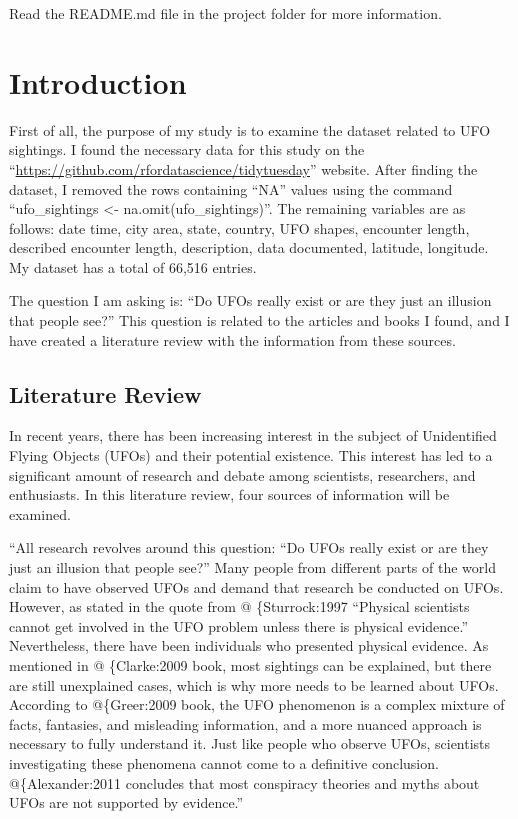 \documentclass[
]{article}
\begin{document}
\colorbox{WildStrawberry}{Read the README.md file in the project folder for more information.}

\hypertarget{introduction}{%
\section{Introduction}\label{introduction}}

First of all, the purpose of my study is to examine the dataset related to UFO sightings. I found the necessary data for this study on the ``\url{https://github.com/rfordatascience/tidytuesday}'' website. After finding the dataset, I removed the rows containing ``NA'' values using the command ``ufo\_sightings \textless- na.omit(ufo\_sightings)''. The remaining variables are as follows: date time, city area, state, country, UFO shapes, encounter length, described encounter length, description, data documented, latitude, longitude. My dataset has a total of 66,516 entries.

The question I am asking is: ``Do UFOs really exist or are they just an illusion that people see?'' This question is related to the articles and books I found, and I have created a literature review with the information from these sources.

\hypertarget{literature-review}{%
\subsection{Literature Review}\label{literature-review}}

In recent years, there has been increasing interest in the subject of Unidentified Flying Objects (UFOs) and their potential existence. This interest has led to a significant amount of research and debate among scientists, researchers, and enthusiasts. In this literature review, four sources of information will be examined.

``All research revolves around this question: ``Do UFOs really exist or are they just an illusion that people see?'' Many people from different parts of the world claim to have observed UFOs and demand that research be conducted on UFOs. However, as stated in the quote from @ \{Sturrock:1997 ``Physical scientists cannot get involved in the UFO problem unless there is physical evidence.'' Nevertheless, there have been individuals who presented physical evidence. As mentioned in @ \{Clarke:2009 book, most sightings can be explained, but there are still unexplained cases, which is why more needs to be learned about UFOs. According to @\{Greer:2009 book, the UFO phenomenon is a complex mixture of facts, fantasies, and misleading information, and a more nuanced approach is necessary to fully understand it. Just like people who observe UFOs, scientists investigating these phenomena cannot come to a definitive conclusion. @\{Alexander:2011 concludes that most conspiracy theories and myths about UFOs are not supported by evidence.''
\end{document}
